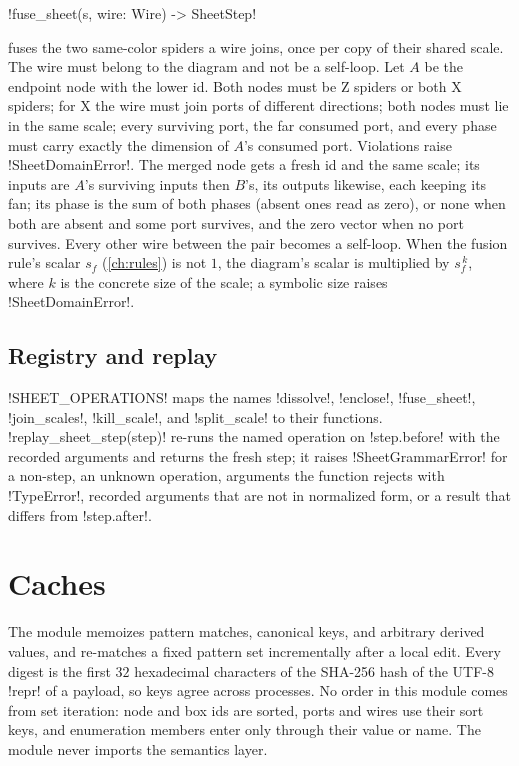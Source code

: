 \begin{signature}
\py!fuse_sheet(s, wire: Wire) -> SheetStep!
\end{signature}
fuses the two same-color spiders a wire joins, once per copy of their shared scale. The wire must
belong to the diagram and not be a self-loop. Let $A$ be the endpoint node with the lower id. Both
nodes must be Z spiders or both X spiders; for X the wire must join ports of different directions;
both nodes must lie in the same scale; every surviving port, the far consumed port, and every phase
must carry exactly the dimension of $A$'s consumed port. Violations raise \py!SheetDomainError!.
The merged node gets a fresh id and the same scale; its inputs are $A$'s surviving inputs then
$B$'s, its outputs likewise, each keeping its fan; its phase is the sum of both phases (absent ones
read as zero), or none when both are absent and some port survives, and the zero vector when no
port survives. Every other wire between the pair becomes a self-loop. When the fusion rule's scalar
$s_f$ (\cref{ch:rules}) is not $1$, the diagram's scalar is multiplied by $s_f^{\,k}$, where $k$ is
the concrete size of the scale; a symbolic size raises \py!SheetDomainError!.

\subsection{Registry and replay}

\py!SHEET_OPERATIONS! maps the names \code!dissolve!, \code!enclose!, \code!fuse_sheet!,
\code!join_scales!, \code!kill_scale!, and \code!split_scale! to their functions.
\py!replay_sheet_step(step)! re-runs the named operation on \py!step.before! with the recorded
arguments and returns the fresh step; it raises \py!SheetGrammarError! for a non-step, an unknown
operation, arguments the function rejects with \py!TypeError!, recorded arguments that are not in
normalized form, or a result that differs from \py!step.after!.

\section{Caches}\label{sec:rewriting-cache}

The module  memoizes pattern matches, canonical keys, and
arbitrary derived values, and re-matches a fixed pattern set incrementally after a local edit.
Every digest is the first $32$ hexadecimal characters of the SHA-256 hash of the UTF-8 \py!repr!
of a payload, so keys agree across processes. No order in this module comes from set iteration:
node and box ids are sorted, ports and wires use their sort keys, and enumeration members enter only
through their value or name. The module never imports the semantics layer.


